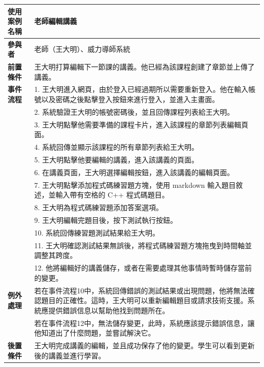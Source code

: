 \documentclass[12pt]{article}
\begin{document}
\begin{table}[H]
  \centering
  \begin{tabular}{|l|p{14cm}|}
  \hline
  \textbf{使用案例名稱} & 老師編輯講義 \\ 
  \hline
  \textbf{參與者} & 老師（王大明）、威力導師系統 \\ 
  \hline
  \textbf{前置條件} & 王大明打算編輯下一節課的講義。他已經為該課程創建了章節並上傳了講義。\\ 
  \hline
  \textbf{事件流程} 
  & 1. 王大明進入網頁，由於登入已經過期所以需要重新登入。他在輸入帳號以及密碼之後點擊登入按鈕來進行登入，並進入主畫面。 \\
  & 2. 系統驗證王大明的帳號密碼後，並且回傳課程列表給王大明。 \\
  & 3. 王大明點擊他需要準備的課程卡片，進入該課程的章節列表編輯頁面。 \\
  & 4. 系統回傳並顯示該課程的所有章節列表給王大明。 \\
  & 5. 王大明點擊他要編輯的講義，進入該講義的頁面。 \\
  & 6. 在講義頁面，王大明選擇編輯按鈕，進入該講義的編輯頁面。 \\
  & 7. 王大明點擊添加程式碼練習題方塊，使用 markdown 輸入題目敘述，並輸入帶有空格的 C++ 程式碼題目。 \\
  & 8. 王大明為程式碼練習題添加答案選項。 \\
  & 9. 王大明編輯完題目後，按下測試執行按鈕。 \\
  & 10. 系統回傳練習題測試結果給王大明。 \\
  & 11. 王大明確認測試結果無誤後，將程式碼練習題方塊拖曳到時間軸並調整其跨度。 \\ 
  & 12. 他將編輯好的講義儲存，或者在需要處理其他事情時暫時儲存當前的變更。 \\
  \hline
  \textbf{例外處理} 
  & 若在事件流程10中，系統回傳錯誤的測試結果或出現問題，他將無法確認題目的正確性。這時，王大明可以重新編輯題目或請求技術支援。系統應提供錯誤信息以幫助他找到問題所在。 \\
  & 若在事件流程12中，無法儲存變更，此時，系統應該提示錯誤信息，讓他知道出了什麼問題，並嘗試解決它。 \\
  \hline
  \textbf{後置條件} & 王大明完成講義的編輯，並且成功保存了他的變更。學生可以看到更新後的講義並進行學習。 \\
  \hline
  \end{tabular}
\end{table}
\end{document}
